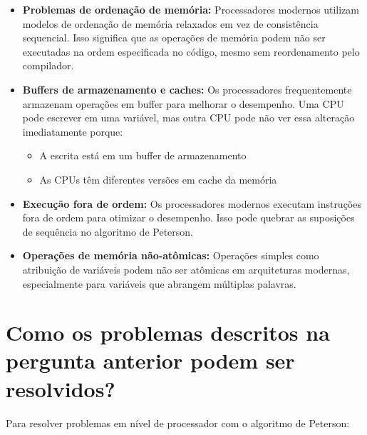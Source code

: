 \documentclass[12pt]{article}
\begin{document}
\begin{itemize}
    \item \textbf{Problemas de ordenação de memória:} Processadores modernos utilizam modelos de ordenação de memória relaxados em vez de consistência sequencial. Isso significa que as operações de memória podem não ser executadas na ordem especificada no código, mesmo sem reordenamento pelo compilador.

    \item \textbf{Buffers de armazenamento e caches:} Os processadores frequentemente armazenam operações em buffer para melhorar o desempenho. Uma CPU pode escrever em uma variável, mas outra CPU pode não ver essa alteração imediatamente porque:
    \begin{itemize}
        \item A escrita está em um buffer de armazenamento
        \item As CPUs têm diferentes versões em cache da memória
    \end{itemize}

    \item \textbf{Execução fora de ordem:} Os processadores modernos executam instruções fora de ordem para otimizar o desempenho. Isso pode quebrar as suposições de sequência no algoritmo de Peterson.

    \item \textbf{Operações de memória não-atômicas:} Operações simples como atribuição de variáveis podem não ser atômicas em arquiteturas modernas, especialmente para variáveis que abrangem múltiplas palavras.
\end{itemize}

\section{Como os problemas descritos na pergunta anterior podem ser resolvidos?}

Para resolver problemas em nível de processador com o algoritmo de Peterson:
\end{document}
